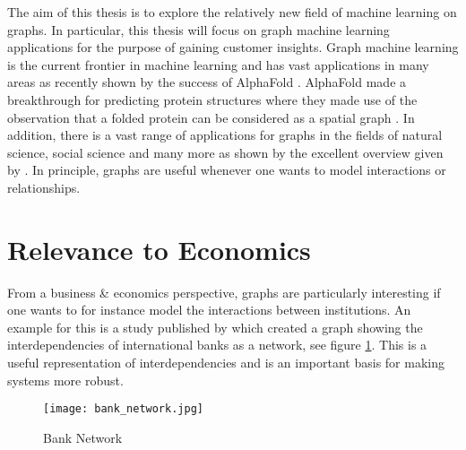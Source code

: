 	
	The aim of this thesis is to explore the relatively new field of machine
	learning on graphs. In particular, this thesis will focus on graph machine
	learning applications for the purpose of gaining customer insights. Graph
	machine learning is the current frontier in machine learning and has vast
	applications in many areas as recently shown by the success of AlphaFold
	\citep{senior2020improved}. AlphaFold made a breakthrough for predicting
	protein structures where they made use of the observation that a folded
	protein can be considered as a spatial graph \citep{AlphaFoldTeam2020}. In
	addition, there is a vast range of applications for graphs in the fields of 
	natural science, social science and many more as shown by the excellent 
	overview given by \cite{zhou2020graph}. In principle, graphs are useful 
	whenever one wants to model interactions or relationships.\\

	\section{Relevance to Economics}

	\noindent From a business \& economics perspective, graphs are particularly
	interesting if one wants to for instance model the interactions between
	institutions. An example for this is a study published by
	\cite{schweitzer2009economic} which created a graph showing the 
	interdependencies of international banks as a network, see figure 
	\ref{fig:bank_network}. This is a useful representation of interdependencies 
	and is an important basis for making systems more robust. \\

	\begin{figure}[h]
		\centering
		\texttt{[image: bank\_network.jpg]}
		\caption{Bank Network}
		\cite[p. 424]{schweitzer2009economic}
		\label{fig:bank_network}
	\end{figure}

